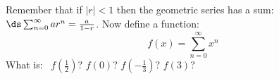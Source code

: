 Remember that if $|r|<1$ then the geometric series has a sum: $\ds \sum_{n=0}^\infty a r^n = \frac{a}{1-r}$.  Now define a function:
    $$f(x) = \sum_{n=0}^\infty x^n$$
What is: \, $f(\frac{1}{2})$? \quad $f(0)$? \quad $f(-\frac{1}{3})$? \quad $f(3)$?